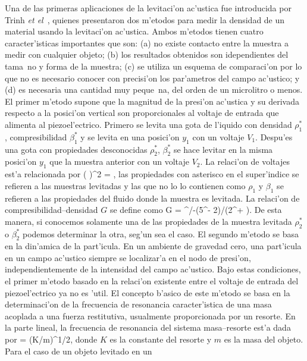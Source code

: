 Una de las primeras aplicaciones de la levitaci'on ac'ustica fue introducida por
Trinh {\it et el}~\cite{trinh86}, quienes presentaron dos m'etodos para medir la densidad de un material usando 
la levitaci'on ac'ustica. Ambos  m'etodos tienen cuatro caracter'isticas importantes que son: (a) no existe
contacto entre la muestra a medir con cualquier objeto; (b) los resultados obtenidos son idependientes
del tama~no y forma de la muestra; (c) se utiliza un esquema de comparaci'on por lo que no es necesario
conocer con precisi'on los par'ametros del campo ac'ustico; y (d) es necesaria una cantidad muy peque~na,
del orden de un microlitro o menos. El primer m'etodo supone que la magnitud de la presi'on ac'ustica y
su derivada respecto a la posici'on vertical son proporcionales al voltaje de entrada que alimenta al
piezoel'ectrico. Primero se levita una gota de l'iquido con densidad $\rho^\ast_1$, compresibilidad $\beta^\ast_1$
y se levita en una posici'on $y_1$ con un voltaje $V_1$. Despu'es una gota con propiedades desconocidas
$\rho^\ast_2$, $\beta^\ast_2$ se hace levitar en la misma posici'on $y_1$ que la muestra anterior con un voltaje  
$V_2$. La relaci'on de voltajes est'a relacionada por
\BE
\left( \right)^2 =  
,
\EE
las propiedades con asterisco en el super'indice se refieren a las muestras levitadas y las que
no lo lo contienen como $\rho_1$ y $\beta_1$ se refieren a las propiedades del fluido donde la muestra
es levitada. La relaci'on de compresibilidad--densidad $G$ se define como
\BE
G =
{\beta^\ast/\beta-(5\rho^\ast - 2\rho)/(2\rho^\ast + \rho)}.
\EE 
De esta manera, si conocemos solamente una de las propiedades de la muestra levitada $\rho_2^\ast$ o 
$\beta_2^\ast$ podemos determinar la otra, seg'un sea el caso. El segundo m'etodo se basa en la din'amica
de la part'icula. En un ambiente de gravedad cero, una part'icula en un campo ac'ustico siempre se localizar'a
en el nodo de presi'on, independientemente de la intensidad del campo ac'ustico. Bajo estas condiciones, el primer
m'etodo basado en la relaci'on existente entre el voltaje de entrada del piezoel'ectrico ya no es 'util. El
concepto b'asico de este m'etodo se basa en la determinaci'on de la frecuencia de resonancia caracter'istica
de una masa acoplada a una fuerza restitutiva, usualmente proporcionada por un resorte. En la parte
lineal, la frecuencia de resonancia del sistema masa--resorte est'a dada por
\BE
\omega = (K/m)^{1/2},
\EE 
donde $K$ es la constante del resorte y $m$ es la masa del objeto. Para el caso de un objeto levitado en un
